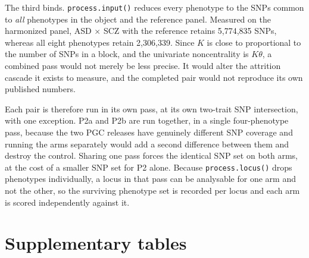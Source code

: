 \documentclass[11pt,a4paper]{article}
\begin{document}
The third binds. \texttt{process.input()} reduces every phenotype to the SNPs common to
\emph{all} phenotypes in the object and the reference panel. Measured on the harmonized
panel, ASD $\times$ SCZ with the reference retains 5,774,835 SNPs, whereas all eight
phenotypes retain 2,306,339. Since $K$ is close to proportional to the number of SNPs in a
block, and the univariate noncentrality is $K\theta$, a combined pass would not merely be
less precise. It would alter the attrition cascade it exists to measure, and the
completed pair would not reproduce its own published numbers.

Each pair is therefore run in its own pass, at its own two-trait SNP intersection, with one
exception. P2a and P2b are run together, in a single four-phenotype pass, because the two
PGC releases have genuinely different SNP coverage and running the arms separately would
add a second difference between them and destroy the control. Sharing one pass forces the
identical SNP set on both arms, at the cost of a smaller SNP set for P2 alone. Because
\texttt{process.locus()} drops phenotypes individually, a locus in that pass can be
analysable for one arm and not the other, so the surviving phenotype set is recorded per
locus and each arm is scored independently against it.

\section{Supplementary tables}
\end{document}
